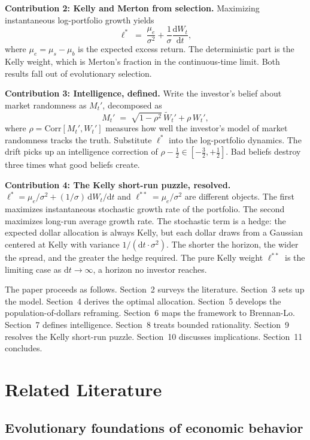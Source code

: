 \documentclass[11pt]{article}
\newcommand{\lopt}{\ell^{*}}
\newcommand{\lkelly}{\ell^{**}}
\newcommand{\mue}{\mu_{e}}
\newcommand{\mub}{\mu_{b}}
\newcommand{\mus}{\mu_{s}}
\newcommand{\Corr}{\mathrm{Corr}}
\newcommand{\dd}{\mathrm{d}}
\begin{document}
\textbf{Contribution 2: Kelly and Merton from selection.}
Maximizing instantaneous log-portfolio growth yields
\[
  \lopt \;=\; \frac{\mue}{\sigma^{2}} + \frac{1}{\sigma}
  \frac{\dd W_{t}}{\dd t},
\]
where $\mue = \mus - \mub$ is the expected excess return. The deterministic
part is the Kelly weight, which is Merton's fraction in the continuous-time
limit. Both results fall out of evolutionary selection.

\textbf{Contribution 3: Intelligence, defined.}
Write the investor's belief about market randomness as $M_{t}'$,
decomposed as
\[
  M_{t}' \;=\; \sqrt{1-\rho^{2}}\,\widetilde{W}_{t}' + \rho\, W_{t}',
\]
where $\rho = \Corr[M_{t}', W_{t}']$ measures how well the
investor's model of market randomness tracks the truth. Substitute
$\lopt$ into the log-portfolio dynamics. The drift picks up an
intelligence correction of $\rho - \tfrac{1}{2} \in
[-\tfrac{3}{2}, +\tfrac{1}{2}]$. Bad beliefs destroy three times
what good beliefs create.

\textbf{Contribution 4: The Kelly short-run puzzle, resolved.}
$\lopt = \mue/\sigma^{2} + (1/\sigma)\,\dd W_{t}/\dd t$ and $\lkelly = \mue/\sigma^{2}$ are different objects.
The first maximizes instantaneous stochastic growth rate of the portfolio. The second
maximizes long-run average growth rate. The stochastic term is a hedge:
the expected dollar allocation is always Kelly, but each dollar draws
from a Gaussian centered at Kelly with variance $1/(\dd t\cdot\sigma^{2})$.
The shorter the horizon, the wider the spread, and the greater the
hedge required. The pure Kelly weight $\lkelly$ is the limiting case
as $\dd t \to \infty$, a horizon no investor reaches.

The paper proceeds as follows. Section~2 surveys the literature.
Section~3 sets up the model. Section~4 derives the optimal allocation.
Section~5 develops the population-of-dollars reframing. Section~6
maps the framework to Brennan-Lo. Section~7 defines intelligence.
Section~8 treats bounded rationality. Section~9 resolves the Kelly
short-run puzzle. Section~10 discusses implications. Section~11
concludes.

\section{Related Literature}

\subsection{Evolutionary foundations of economic behavior}
\end{document}
